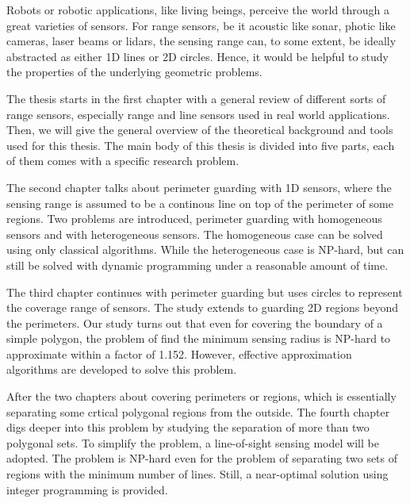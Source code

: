 \begin{my_abstract}

Robots or robotic applications, like living beings, perceive the world through
a great varieties of sensors.
For range sensors, be it acoustic like sonar, photic like cameras, laser beams or lidars, 
the sensing range can, to some extent, be ideally abstracted as either 1D lines or 2D circles.
Hence, it would be helpful to study the properties of the underlying geometric problems.

The thesis starts in the first chapter with a general review of different sorts of range sensors, 
especially range and line sensors used in real world applications. 
Then, we will give the general overview of the theoretical background and tools used for this thesis. 
The main body of this thesis is divided into five parts, each of them comes with 
a specific research problem. 

The second chapter talks about perimeter guarding with 1D sensors, where the sensing range 
is assumed to be a continous line on top of the perimeter of some regions. Two problems are 
introduced, perimeter guarding with homogeneous sensors and with heterogeneous sensors. 
The homogeneous case can be solved using only classical algorithms. 
While the heterogeneous case is NP-hard, but can still be solved with dynamic programming under a reasonable
amount of time. 

The third chapter continues with perimeter guarding but uses circles to represent the 
coverage range of sensors. The study extends to guarding 2D regions beyond the perimeters. 
Our study turns out that even for covering the boundary of a simple polygon, 
the problem of find the minimum sensing radius is NP-hard to approximate within a factor of 1.152. 
However, effective approximation algorithms are developed to solve this problem. 

After the two chapters about covering perimeters or regions, which is essentially separating 
some crtical polygonal regions from the outside. 
The fourth chapter digs deeper into this problem by studying the separation of more than two polygonal sets. 
To simplify the problem, a line-of-sight sensing model will be adopted. 
The problem is NP-hard even for the problem of separating two sets of regions with the minimum number of lines.
Still, a near-optimal solution using integer programming is provided.


\end{my_abstract}

